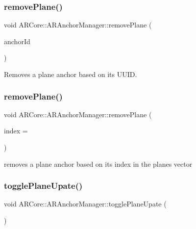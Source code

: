 \subsubsection{\texorpdfstring{remove\+Plane()}{removePlane()}\hspace{0.1cm}{\footnotesize\ttfamily [1/2]}}
{\footnotesize\ttfamily void A\+R\+Core\+::\+A\+R\+Anchor\+Manager\+::remove\+Plane (\begin{DoxyParamCaption}\item[{N\+S\+U\+U\+ID $\ast$}]{anchor\+Id }\end{DoxyParamCaption})}



Removes a plane anchor based on it\textquotesingle{}s U\+U\+ID. 

\mbox{\label{class_a_r_core_1_1_a_r_anchor_manager_a7d01736351089d31708ca4c577da99a4}} 
\subsubsection{\texorpdfstring{remove\+Plane()}{removePlane()}\hspace{0.1cm}{\footnotesize\ttfamily [2/2]}}
{\footnotesize\ttfamily void A\+R\+Core\+::\+A\+R\+Anchor\+Manager\+::remove\+Plane (\begin{DoxyParamCaption}\item[{int}]{index = {} }\end{DoxyParamCaption})}



removes a plane anchor based on it\textquotesingle{}s index in the planes vector 

\mbox{\label{class_a_r_core_1_1_a_r_anchor_manager_a78da6cdbe64e12e49dc67adef5ac085b}} 
\subsubsection{\texorpdfstring{toggle\+Plane\+Upate()}{togglePlaneUpate()}}
{\footnotesize\ttfamily void A\+R\+Core\+::\+A\+R\+Anchor\+Manager\+::toggle\+Plane\+Upate (\begin{DoxyParamCaption}{ }\end{DoxyParamCaption})\hspace{0.3cm}{\ttfamily [inline]}}




